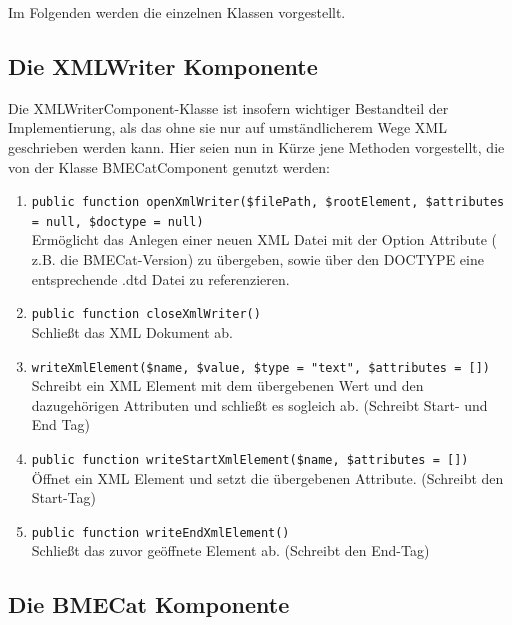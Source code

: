 	
	
	
	Im Folgenden werden die einzelnen Klassen vorgestellt.
	
	\subsection{Die XMLWriter Komponente}
	
	Die XMLWriterComponent-Klasse ist insofern wichtiger Bestandteil der Implementierung, als das ohne sie nur auf umständlicherem Wege XML geschrieben werden kann. Hier seien nun in Kürze jene Methoden vorgestellt, die von der Klasse BMECatComponent genutzt werden:
	
	\begin{enumerate}[noitemsep]
	\item \texttt{public function openXmlWriter(\$filePath, \$rootElement, \$attributes = null, \$doctype = null)} \\
		  Ermöglicht das Anlegen einer neuen XML Datei mit der Option Attribute ( z.B. die BMECat-Version) zu übergeben, sowie über den DOCTYPE eine entsprechende .dtd Datei zu referenzieren.
	\item \texttt{public function closeXmlWriter()} \\
		  Schließt das XML Dokument ab.
	\item \texttt{writeXmlElement(\$name, \$value, \$type = "text", \$attributes = [])}\\
		  Schreibt ein XML Element mit dem übergebenen Wert und den dazugehörigen Attributen und schließt es sogleich ab. (Schreibt Start- und End Tag)
	\item \texttt{public function writeStartXmlElement(\$name, \$attributes = [])}\\
		  Öffnet ein XML Element und setzt die übergebenen Attribute. (Schreibt den Start-Tag)
	\item \texttt{public function writeEndXmlElement()}\\
		  Schließt das zuvor geöffnete Element ab. (Schreibt den End-Tag)
	\end{enumerate}
	
	\subsection{Die BMECat Komponente}
	
